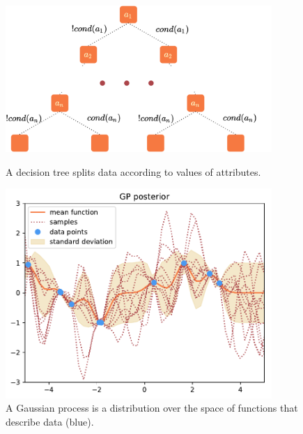 \documentclass[a4paper,cleardoubleempty,BCOR1cm, 11pt]{report}
\begin{document}
\begin{figure}
	\centering
	\begin{minipage}[t]{0.45\textwidth}
		\centering
		\includegraphics[width=0.9\textwidth]{images/decisiontree.pdf} 
		\caption{A decision tree splits data according to values of attributes.}
		\label{fig:decision_tree}
	\end{minipage}\hfill
	\begin{minipage}[t]{0.45\textwidth}
		\centering
		\includegraphics[width=0.9\textwidth]{images/post.pdf}
		\caption{A Gaussian process is a distribution over the space of functions that describe data (blue).}
	\end{minipage}
\end{figure}
\end{document}
